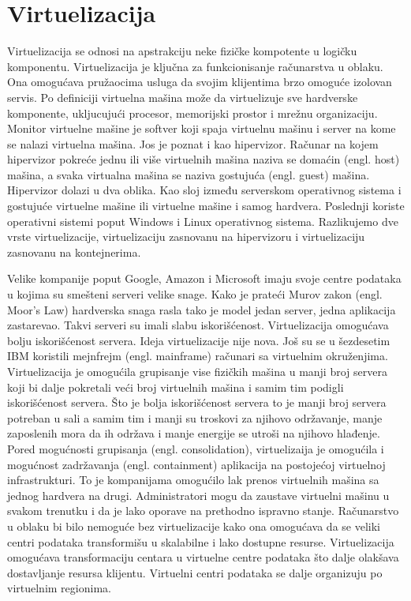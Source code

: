 \documentclass[12pt,oneside]{memoir}
\begin{document}


\section{Virtuelizacija}
Virtuelizacija se odnosi na apstrakciju neke fizičke kompotente u logičku komponentu. Virtuelizacija je ključna za funkcionisanje računarstva u oblaku. Ona omogućava pružaocima usluga da svojim klijentima brzo omoguće izolovan servis. Po definiciji virtuelna mašina može da virtuelizuje sve hardverske komponente, ukljucujući procesor, memorijski prostor i mrežnu organizaciju\cite{ve}. Monitor virtuelne mašine je softver koji spaja virtuelnu mašinu i server na kome se nalazi virtuelna mašina. Jos je poznat i kao hipervizor. Računar na kojem hipervizor pokreće jednu ili više virtuelnih mašina naziva se domaćin (engl. host) mašina, a svaka virtualna mašina se naziva gostujuća (engl. guest) mašina. Hipervizor dolazi u dva oblika. Kao sloj između serverskom operativnog sistema i gostujuće virtuelne mašine ili virtuelne mašine i samog hardvera\cite{ve}. Poslednji koriste operativni sistemi poput Windows i Linux operativnog sistema. Razlikujemo dve vrste virtuelizacije, virtuelizaciju zasnovanu na hipervizoru i virtuelizaciju zasnovanu na kontejnerima.
 
Velike kompanije poput Google, Amazon i Microsoft imaju svoje centre podataka u kojima su smešteni serveri velike snage. Kako je prateći Murov zakon (engl. Moor's Law) hardverska snaga rasla tako je model jedan server, jedna aplikacija zastarevao. Takvi serveri su imali slabu iskorišćenost. Virtuelizacija omogućava bolju iskorišćenost servera. Ideja virtuelizacije nije nova. Još su se u šezdesetim IBM koristili mejnfrejm (engl. mainframe) računari sa virtuelnim okruženjima. Virtuelizacija je omogućila grupisanje vise fizičkih mašina u manji broj servera koji bi dalje pokretali veći broj virtuelnih mašina i samim tim podigli iskorišćenost servera. Što je bolja iskorišćenost servera to je manji broj servera potreban u sali a samim tim i manji su troskovi za njihovo održavanje, manje zaposlenih mora da ih održava i manje energije se utroši na njihovo hlađenje. Pored mogućnosti grupisanja (engl. consolidation), virtuelizaija je omogućila i mogućnost zadržavanja (engl. containment) aplikacija na postojećoj virtuelnoj infrastrukturi. To je kompanijama omogućilo lak prenos virtuelnih mašina sa jednog hardvera na drugi. Administratori mogu da zaustave virtuelni mašinu u svakom trenutku i da je lako oporave na prethodno ispravno stanje. Računarstvo u oblaku bi bilo nemoguće bez virtuelizacije kako ona omogućava da se veliki centri podataka transformišu u skalabilne i lako dostupne resurse. Virtuelizacija omogućava transformaciju centara u virtuelne centre podataka što dalje olakšava dostavljanje resursa klijentu. Virtuelni centri podataka se dalje organizuju po virtuelnim regionima\cite{ve}.
\end{document}
